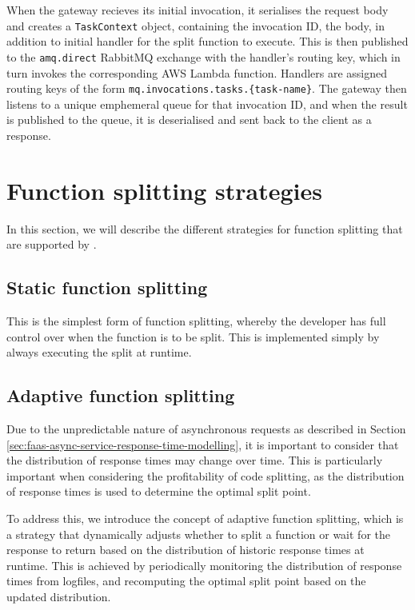 When the gateway recieves its initial invocation, it serialises the request body and creates a \verb|TaskContext| object, containing the invocation ID, the body, in addition to initial handler for the split function to execute. This is then published to the \verb|amq.direct| RabbitMQ exchange with the handler's routing key, which in turn invokes the corresponding AWS Lambda function. Handlers are assigned routing keys of the form \verb|mq.invocations.tasks.{task-name}|. The gateway then listens to a unique emphemeral queue for that invocation ID, and when the result is published to the queue, it is deserialised and sent back to the client as a response.

\section{Function splitting strategies}
\label{sec:faas-function-splitting-strategies}
In this section, we will describe the different strategies for function splitting that are supported by \faaas{}.

\subsection{Static function splitting}
This is the simplest form of function splitting, whereby the developer has full control over when the function is to be split. This is implemented simply by always executing the split at runtime.

\subsection{Adaptive function splitting}
\label{sec:faaas-adaptive-function-splitting}
Due to the unpredictable nature of asynchronous requests as described in Section \ref{sec:faas-async-service-response-time-modelling}, it is important to consider that the distribution of response times may change over time. This is particularly important when considering the profitability of code splitting, as the distribution of response times is used to determine the optimal split point.

To address this, we introduce the concept of adaptive function splitting, which is a strategy that dynamically adjusts whether to split a function or wait for the response to return based on the distribution of historic response times at runtime. This is achieved by periodically monitoring the distribution of response times from logfiles, and recomputing the optimal split point based on the updated distribution.

